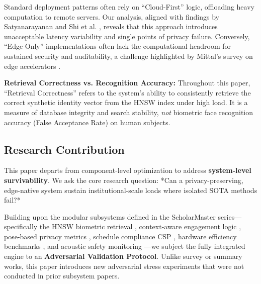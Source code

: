 \documentclass[conference]{IEEEtran}
\begin{document}
Standard deployment patterns often rely on ``Cloud-First'' logic, offloading heavy computation to remote servers. Our analysis, aligned with findings by Satyanarayanan \cite{b4} and Shi et al. \cite{b5}, reveals that this approach introduces unacceptable latency variability and single points of privacy failure. Conversely, ``Edge-Only'' implementations often lack the computational headroom for sustained security and auditability, a challenge highlighted by Mittal's survey on edge accelerators \cite{b18}.

\begin{tcolorbox}[colback=yellow!5!white,colframe=yellow!75!black,title=Note on Evaluation Metrics]
\textbf{Retrieval Correctness vs. Recognition Accuracy:} Throughout this paper, ``Retrieval Correctness'' refers to the system's ability to consistently retrieve the correct synthetic identity vector from the HNSW index under high load. It is a measure of database integrity and search stability, \textit{not} biometric face recognition accuracy (False Acceptance Rate) on human subjects.
\end{tcolorbox}

\subsection{Research Contribution}
This paper departs from component-level optimization to address \textbf{system-level survivability}. We ask the core research question: *Can a privacy-preserving, edge-native system sustain institutional-scale loads where isolated SOTA methods fail?*

Building upon the modular subsystems defined in the ScholarMaster series---specifically the HNSW biometric retrieval \cite{p1}, context-aware engagement logic \cite{p2}, pose-based privacy metrics \cite{p3}, schedule compliance CSP \cite{p4}, hardware efficiency benchmarks \cite{p5}, and acoustic safety monitoring \cite{p6}---we subject the fully integrated engine to an \textbf{Adversarial Validation Protocol}. Unlike survey or summary works, this paper introduces new adversarial stress experiments that were not conducted in prior subsystem papers.
\end{document}
